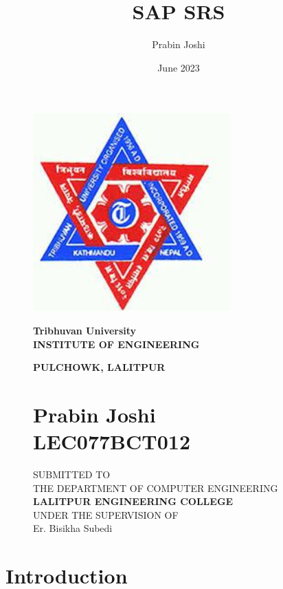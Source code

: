 \documentclass{article}
\title{SAP SRS}
\author{Prabin Joshi}
\date{June 2023}
\begin{document}
\begin{figure}[h]
\centering
    \includegraphics[width = 3in]{Static/ioe.png}
    \\
    \begin{center}
        \textbf{Tribhuvan University}\\
        \vspace{2mm}
        {\fontsize{14pt}{20}\selectfont \textbf{\MakeUppercase{Institute of engineering}}}
        \vspace{2mm}
        
        {\fontsize{14pt}{5}\selectfont \textbf{\MakeUppercase{Pulchowk, lalitpur}}}
    \end{center}
\begin{center}
\section*{Prabin Joshi\\LEC077BCT012}
\vspace{3mm}
    SUBMITTED TO\\ \vspace{1mm} THE DEPARTMENT OF COMPUTER ENGINEERING\\ \vspace{1mm}\textbf{LALITPUR ENGINEERING COLLEGE}\\ \vspace{1mm} UNDER THE SUPERVISION OF\\ \vspace{1mm}Er. Bisikha Subedi 
\end{center}

\end{figure}

\newpage
\tableofcontents
\newpage

\section{Introduction}
\end{document}
